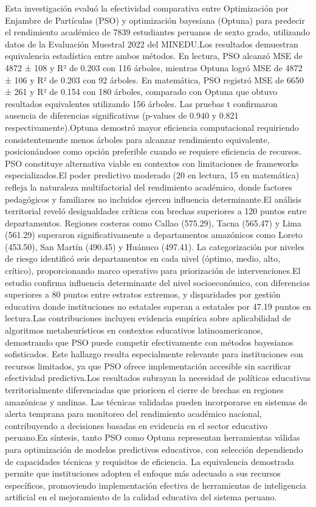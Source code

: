 \documentclass[conference]{IEEEtran}
\begin{document}
Esta investigación evaluó la efectividad comparativa entre Optimización por Enjambre de Partículas (PSO) y optimización bayesiana (Optuna) para predecir el rendimiento académico de 7839 estudiantes peruanos de sexto grado, utilizando datos de la Evaluación Muestral 2022 del MINEDU.Los resultados demuestran equivalencia estadística entre ambos métodos. En lectura, PSO alcanzó MSE de 4872 ± 108 y R² de 0.203 con 116 árboles, mientras Optuna logró MSE de 4872 ± 106 y R² de 0.203 con 92 árboles. En matemática, PSO registró MSE de 6650 ± 261 y R² de 0.154 con 180 árboles, comparado con Optuna que obtuvo resultados equivalentes utilizando 156 árboles. Las pruebas t confirmaron ausencia de diferencias significativas (p-values de 0.940 y 0.821 respectivamente).Optuna demostró mayor eficiencia computacional requiriendo consistentemente menos árboles para alcanzar rendimiento equivalente, posicionándose como opción preferible cuando se requiere eficiencia de recursos. PSO constituye alternativa viable en contextos con limitaciones de frameworks especializados.El poder predictivo moderado (20 en lectura, 15 en matemática) refleja la naturaleza multifactorial del rendimiento académico, donde factores pedagógicos y familiares no incluidos ejercen influencia determinante.El análisis territorial reveló desigualdades críticas con brechas superiores a 120 puntos entre departamentos. Regiones costeras como Callao (575.29), Tacna (565.47) y Lima (561.29) superaron significativamente a departamentos amazónicos como Loreto (453.50), San Martín (490.45) y Huánuco (497.41). La categorización por niveles de riesgo identificó seis departamentos en cada nivel (óptimo, medio, alto, crítico), proporcionando marco operativo para priorización de intervenciones.El estudio confirma influencia determinante del nivel socioeconómico, con diferencias superiores a 80 puntos entre estratos extremos, y disparidades por gestión educativa donde instituciones no estatales superan a estatales por 47.19 puntos en lectura.Las contribuciones incluyen evidencia empírica sobre aplicabilidad de algoritmos metaheurísticos en contextos educativos latinoamericanos, demostrando que PSO puede competir efectivamente con métodos bayesianos sofisticados. Este hallazgo resulta especialmente relevante para instituciones con recursos limitados, ya que PSO ofrece implementación accesible sin sacrificar efectividad predictiva.Los resultados subrayan la necesidad de políticas educativas territorialmente diferenciadas que prioricen el cierre de brechas en regiones amazónicas y andinas. Las técnicas validadas pueden incorporarse en sistemas de alerta temprana para monitoreo del rendimiento académico nacional, contribuyendo a decisiones basadas en evidencia en el sector educativo peruano.En síntesis, tanto PSO como Optuna representan herramientas válidas para optimización de modelos predictivos educativos, con selección dependiendo de capacidades técnicas y requisitos de eficiencia. La equivalencia demostrada permite que instituciones adopten el enfoque más adecuado a sus recursos específicos, promoviendo implementación efectiva de herramientas de inteligencia artificial en el mejoramiento de la calidad educativa del sistema peruano.
\end{document}
